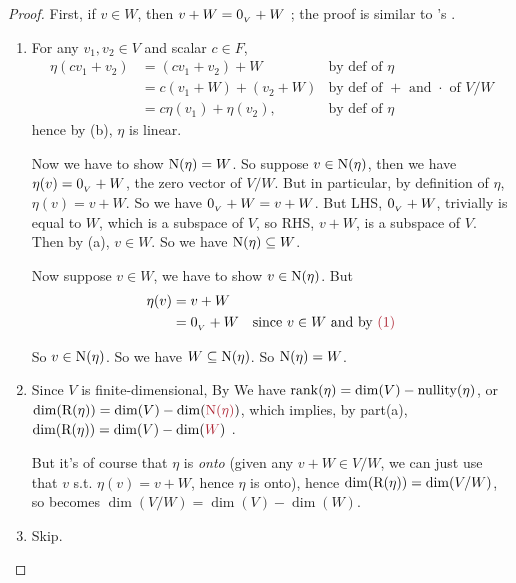 \begin{proof}
First, if \(v \in W\), then \(v + W = 0_{_V} + W\) ;
the proof is similar to 's \RED{(*)}.
\begin{enumerate}
\item For any \(v_1, v_2 \in V\) and scalar \(c \in F\),
\begin{align*}
    \eta(c v_1 + v_2) & = (c v_1 + v_2) + W & \text{by def of \(\eta\)} \\
                      & = c(v_1 + W) + (v_2 + W) & \text{by def of \(+\) and \(\cdot\) of \(V/W\)} \\
                      & = c\eta(v_1) + \eta(v_2), & \text{by def of \(\eta\)}
\end{align*}
hence by (b), \(\eta\) is linear.

Now we have to show \(\mathrm{N}(\eta) = W\).
So suppose \(v \in \mathrm{N}(\eta)\), then we have \(\eta(v) = 0_{_V} + W\), the zero vector of \(V/W\).
But in particular, by definition of \(\eta\), \(\eta(v) = v + W\).
So we have \(0_{_V} + W = v + W\).
But LHS, \(0_{_V} + W\), trivially is equal to \(W\), which is a subspace of \(V\), so RHS, \(v + W\), is a subspace of \(V\).
Then by (a), \(v \in W\).
So we have \(\mathrm{N}(\eta) \subseteq W\).

Now suppose \(v \in W\), we have to show \(v \in \mathrm{N}(\eta)\).
But
\begin{align*}
    \eta(v) & = v + W \\
            & = \OV + W & \text{since \(v \in W\) and by \MAROON{(1)}}
\end{align*}

So \(v \in \mathrm{N}(\eta)\).
So we have \(W \subseteq \mathrm{N}(\eta)\).
So \(\mathrm{N}(\eta) = W\).

\item
Since \(V\) is finite-dimensional, By  We have \(\mathrm{rank}(\eta) = \dim(V) - \mathrm{nullity}(\eta)\), or \(\dim(\RANGE(\eta)) = \dim(V) - \dim(\MAROON{\NULL(\eta)})\), which implies, by part(a), \(\dim(\RANGE(\eta)) = \dim(V) - \dim(\MAROON{W})\) .

But it's of course that \(\eta\) is \emph{onto} (given any \(v + W \in V/W\), we can just use that \(v\) s.t. \(\eta(v) = v + W\), hence \(\eta\) is onto),
hence \(\dim(\mathrm{R}(\eta)) = \dim(V/W)\), so  becomes \(\dim(V/W) = \dim(V) - \dim(W)\).

\item Skip.
\end{enumerate}
\end{proof}



